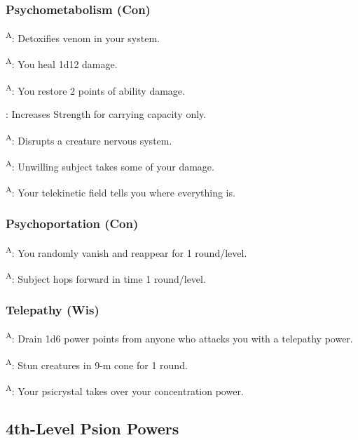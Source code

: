 \subsubsection{Psychometabolism (Con)}

\textsuperscript{A}: Detoxifies venom in your system.

\textsuperscript{A}: You heal 1d12 damage.

\textsuperscript{A}: You restore 2 points of ability damage.

: Increases Strength for carrying capacity only.

\textsuperscript{A}: Disrupts a creature nervous system.

\textsuperscript{A}: Unwilling subject takes some of your damage.

\textsuperscript{A}: Your telekinetic field tells you where everything is.


\subsubsection{Psychoportation (Con)}

\textsuperscript{A}: You randomly vanish and reappear for 1 round/level.

\textsuperscript{A}: Subject hops forward in time 1 round/level.


\subsubsection{Telepathy (Wis)}

\textsuperscript{A}: Drain 1d6 power points from anyone who attacks you with a telepathy power.

\textsuperscript{A}: Stun creatures in 9-m cone for 1 round.

\textsuperscript{A}: Your psicrystal takes over your concentration power.



\subsection{4th-Level Psion Powers}


